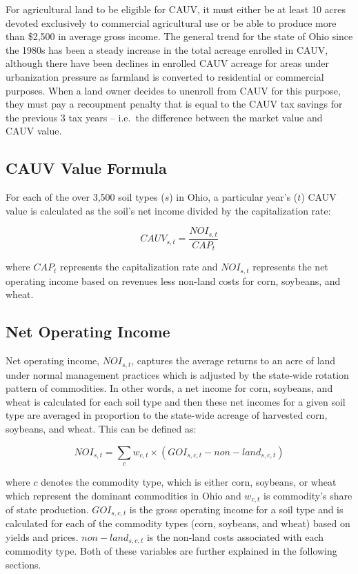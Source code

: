 \documentclass[]{article}
\begin{document}
For agricultural land to be eligible for CAUV, it must either be at
least 10 acres devoted exclusively to commercial agricultural use or be
able to produce more than \$2,500 in average gross income. The general
trend for the state of Ohio since the 1980s has been a steady increase
in the total acreage enrolled in CAUV, although there have been declines
in enrolled CAUV acreage for areas under urbanization pressure as
farmland is converted to residential or commercial purposes. When a land
owner decides to unenroll from CAUV for this purpose, they must pay a
recoupment penalty that is equal to the CAUV tax savings for the
previous 3 tax years -- i.e.~the difference between the market value and
CAUV value.

\hypertarget{cauv-value-formula}{%
\subsection{CAUV Value Formula}\label{cauv-value-formula}}

For each of the over 3,500 soil types (\(s\)) in Ohio, a particular
year's (\(t\)) CAUV value is calculated as the soil's net income divided
by the capitalization rate:

\[
CAUV_{s,t} = \frac{NOI_{s,t}}{CAP_t} \label{eq:cauv}
\]

where \(CAP_t\) represents the capitalization rate and \(NOI_{s,t}\)
represents the net operating income based on revenues less non-land
costs for corn, soybeans, and wheat.

\hypertarget{net-operating-income}{%
\subsection{Net Operating Income}\label{net-operating-income}}

Net operating income, \({NOI_{s,t}}\), captures the average returns to
an acre of land under normal management practices which is adjusted by
the state-wide rotation pattern of commodities. In other words, a net
income for corn, soybeans, and wheat is calculated for each soil type
and then these net incomes for a given soil type are averaged in
proportion to the state-wide acreage of harvested corn, soybeans, and
wheat. This can be defined as:

\[
NOI_{s,t} = \sum_{c} w_{c,t}\times(GOI_{s,c,t} - {non-land}_{s,c,t})
\]

where \(c\) denotes the commodity type, which is either corn, soybeans,
or wheat which represent the dominant commodities in Ohio and
\(w_{c,t}\) is commodity's share of state production. \(GOI_{s,c,t}\) is
the gross operating income for a soil type and is calculated for each of
the commodity types (corn, soybeans, and wheat) based on yields and
prices. \({non-land}_{s,c,t}\) is the non-land costs associated with
each commodity type. Both of these variables are further explained in
the following sections.
\end{document}
